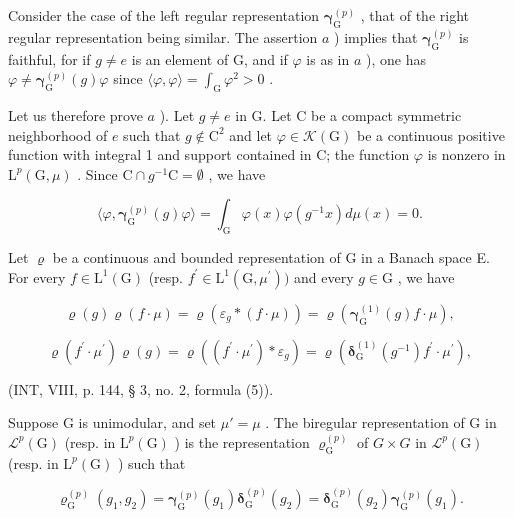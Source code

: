 Consider the case of the left regular representation \(\boldsymbol{\gamma}_{\mathrm{G}}^{(p)}\) , that of the right regular representation being similar. The assertion \(a\) ) implies that \(\boldsymbol{\gamma}_{\mathrm{G}}^{(p)}\) is faithful, for if \(g \neq e\) is an element of G, and if \(\varphi\) is as in \(a\) ), one has \(\varphi \neq \boldsymbol{\gamma}_{\mathrm{G}}^{(p)}(g)\varphi\) since \(\langle \varphi, \varphi \rangle = \int_{\mathrm{G}} \varphi^2 > 0\) .

Let us therefore prove \(a\) ). Let \(g \neq e\) in G. Let C be a compact symmetric neighborhood of \(e\) such that \(g \notin \mathrm{C}^2\) and let \(\varphi \in \mathcal{K}(\mathrm{G})\) be a continuous positive function with integral 1 and support contained in C; the function \(\varphi\) is nonzero in \(\mathrm{L}^p(\mathrm{G}, \mu)\) . Since \(\mathrm{C} \cap g^{-1}\mathrm{C} = \emptyset\) , we have

\[
\langle \varphi , \boldsymbol {\gamma} _ {\mathrm{G}} ^ {(p)} (g) \varphi \rangle = \int_ {\mathrm{G}} \varphi (x) \varphi (g ^ {- 1} x) d \mu (x) = 0.
\]

Let \(\varrho\) be a continuous and bounded representation of G in a Banach space E. For every \(f\in \mathrm{L}^1 (\mathrm{G})\) (resp. \(f^{\prime}\in \mathrm{L}^{1}(\mathrm{G},\mu^{\prime}))\) and every \(g\in \mathrm{G}\) , we have

\[
\varrho (g) \varrho (f \cdot \mu) = \varrho (\varepsilon_ {g} * (f \cdot \mu)) = \varrho (\boldsymbol {\gamma} _ {\mathrm{G}} ^ {(1)} (g) f \cdot \mu),\tag{1}
\]

\[
\varrho (f ^ {\prime} \cdot \mu^ {\prime}) \varrho (g) = \varrho ((f ^ {\prime} \cdot \mu^ {\prime}) * \varepsilon_ {g}) = \varrho (\boldsymbol {\delta} _ {\mathrm{G}} ^ {(1)} (g ^ {- 1}) f ^ {\prime} \cdot \mu ^ {\prime}),\tag{2}
\]

(INT, VIII, p. 144, § 3, no. 2, formula (5)).

Suppose G is unimodular, and set \(\mu' = \mu\) . The biregular representation of G in \(\mathcal{L}^{p}(\mathrm{G})\) (resp. in \(\mathrm{L}^{p}(\mathrm{G})\) ) is the representation \(\varrho_{\mathrm{G}}^{(p)}\) of \(G \times G\) in \(\mathcal{L}^{p}(\mathrm{G})\) (resp. in \(\mathrm{L}^{p}(\mathrm{G})\) ) such that

\[
\boldsymbol {\varrho} _ {\mathrm{G}} ^ {(p)} (g _ {1}, g _ {2}) = \boldsymbol {\gamma} _ {\mathrm{G}} ^ {(p)} (g _ {1}) \boldsymbol {\delta} _ {\mathrm{G}} ^ {(p)} (g _ {2}) = \boldsymbol {\delta} _ {\mathrm{G}} ^ {(p)} (g _ {2}) \boldsymbol {\gamma} _ {\mathrm{G}} ^ {(p)} (g _ {1}).
\]

